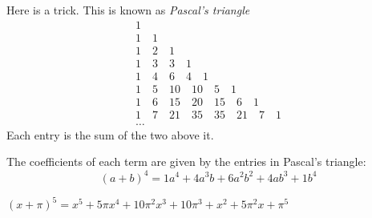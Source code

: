 Here is a trick. This is known as \emph{Pascal's triangle}
\begin{equation*}
\begin{array}{c}
 1 \\
 1 \quad 1 \\
 1 \quad 2 \quad 1 \\
 1 \quad 3 \quad 3 \quad 1 \\
 1 \quad 4 \quad 6 \quad 4 \quad 1 \\
 1 \quad 5 \quad 10 \quad 10 \quad 5 \quad 1 \\
 1 \quad 6 \quad 15 \quad 20 \quad 15 \quad 6 \quad 1 \\
 1 \quad 7 \quad 21 \quad 35 \quad 35 \quad 21 \quad 7 \quad 1 \\
 \ldots
\end{array}
\end{equation*}
Each entry is the sum of the two above it.

The coefficients of each term are given by the entries in Pascal's triangle:
\begin{equation*}
(a + b)^4 = 1a^4 + 4a^3b + 6a^2 b^2 + 4 a b^3 + 1 b^4   
\end{equation*}

\begin{Exercise}[title={Using Pascal's Triangle}, label=pascalbinomial]
\end{Exercise}
\begin{Answer}[ref=pascalbinomial]
  $(x + \pi)^5 = x^5 + 5\pi x^4 + 10\pi^2 x^3 + 10 \pi^3 + x^2 + 5 \pi^2 x + \pi^5$
\end{Answer}
